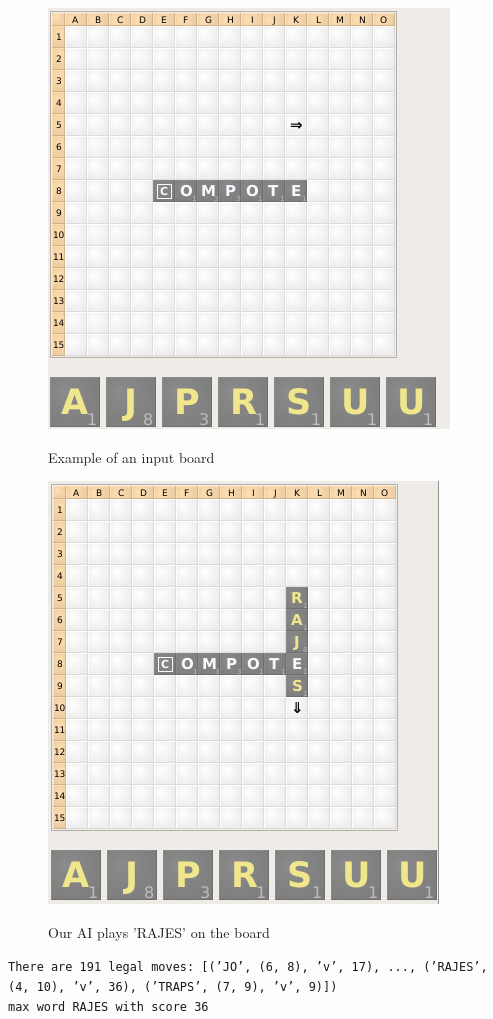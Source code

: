 \documentclass[12pt]{article}
\begin{document}
\begin{figure}[h]
    \centering
  \includegraphics[scale=0.4]{exampleboard}
  \caption{Example of an input board}
  \endminipage
      \centering
  \includegraphics[scale=0.4]{exampleplay}\\
   \caption{Our AI plays 'RAJES' on the board}
  \endminipage{}
\end{figure}

\noindent
\texttt{There are 191 legal moves: [('JO', (6, 8), 'v', 17), ...,  ('RAJES', (4, 10), 'v', 36), ('TRAPS', (7, 9), 'v', 9)])\\
max word RAJES with score 36}
\end{document}

